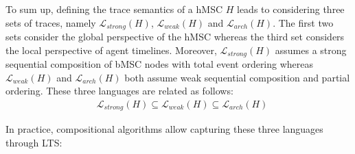 To sum up, defining the trace semantics of a hMSC $H$ leads to considering three sets of traces, namely $\mathcal{L}_{strong}(H)$, $\mathcal{L}_{weak}(H)$ and $\mathcal{L}_{arch}(H)$. The first two sets consider the global perspective of the hMSC whereas the third set considers the local perspective of agent timelines. Moreover, $\mathcal{L}_{strong}(H)$ assumes a strong sequential composition of bMSC nodes with total event ordering whereas $\mathcal{L}_{weak}(H)$ and $\mathcal{L}_{arch}(H)$ both assume weak sequential composition and partial ordering. These three languages are related as follows:
\begin{align*}
&\mathcal{L}_{strong}(H) \subseteq \mathcal{L}_{weak}(H) \subseteq \mathcal{L}_{arch}(H)
\end{align*}

In practice, compositional algorithms allow capturing these three languages through LTS:
